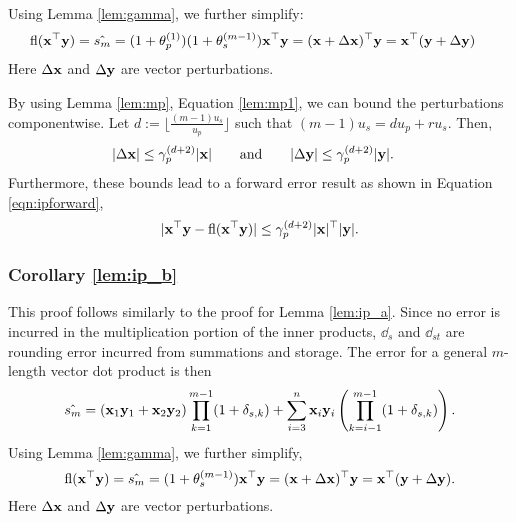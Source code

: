 Using Lemma \ref{lem:gamma}, we further simplify:
\begin{align*}
\fl(\bb{x}^{\top}\bb{y}) &= \hat{s_m} = (1+\tth_p^{(1)})(1+\tth_s^{(m-1)})\bb{x}^{\top}\bb{y}%
= (\bb{x}+\Delta\bb{x})^{\top}\bb{y} = \bb{x}^{\top}(\bb{y}+\Delta\bb{y})
\end{align*}
Here $\Delta\mathbf{x}$ and $\Delta\mathbf{y}$ are vector perturbations.

By using Lemma \ref{lem:mp}, Equation \ref{lem:mp1}, we can bound the perturbations componentwise.
Let $d:=\lfloor\frac{(m-1)u_s}{u_p}\rfloor$ such that $(m-1)u_s = d u_p + r u_s$. Then,
\begin{align*}
|\Delta \bb{x}| &\leq \gamma_p^{(d+2)}|\bb{x}| %
\qquad \mbox{and} \qquad
|\Delta \bb{y}| %
\leq \gamma_p^{(d+2)}|\bb{y}|.
\end{align*}
Furthermore, these bounds lead to a forward error result as shown in Equation \ref{eqn:ipforward},
\begin{equation}
\label{eqn:ipforward}
|\mathbf{x}^{\top}\mathbf{y}-\mathrm{fl}(\mathbf{x}^{\top}\mathbf{y})| \leq \gamma_p^{(d+2)}|\mathbf{x}|^{\top}|\mathbf{y}|.
\end{equation}
%
%

\subsubsection{Corollary \ref{lem:ip_b}}
This proof follows similarly to the proof for Lemma \ref{lem:ip_a}.
Since no error is incurred in the multiplication portion of the inner products, $\dd_s$ and $\dd_{st}$ are rounding error incurred from summations and storage.
The error for a general $m$-length vector dot product is then
\begin{equation}
\label{eqn:dperr_2}
\hat{s_m} = (\mathbf{x}_1\mathbf{y}_1+\mathbf{x}_2\mathbf{y}_2)\prod_{k=1}^{m-1}(1+\delta_{s,k}) + \sum_{i=3}^n \mathbf{x}_i\mathbf{y}_i\left(\prod_{k=i-1}^{m-1}(1+\delta_{s,k})\right).
\end{equation}
Using Lemma \ref{lem:gamma}, we further simplify, 
\begin{equation*}
\mathrm{fl}(\mathbf{x}^{\top}\mathbf{y}) = \hat{s_m} = (1+\theta_s^{(m-1)})\mathbf{x}^{\top}\mathbf{y}= (\mathbf{x}+\Delta\mathbf{x})^{\top}\mathbf{y} = \mathbf{x}^{\top}(\mathbf{y}+\Delta\mathbf{y}).
\end{equation*}
Here $\Delta\mathbf{x}$ and $\Delta\mathbf{y}$ are vector perturbations.

